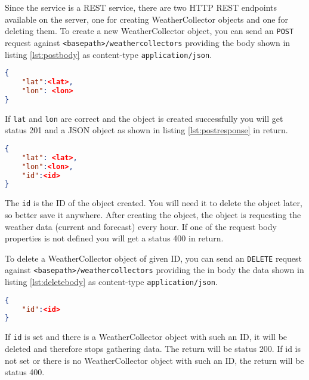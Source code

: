 Since the service is a REST service, there are two HTTP REST endpoints available on the server, one for creating WeatherCollector objects and one for deleting them.
To create a new WeatherCollector object, you can send an \texttt{POST} request against \texttt{<basepath>/weathercollectors} providing the body shown in listing \ref{lst:postbody} as content-type \texttt{application/json}. 
\begin{lstlisting}[caption={Body of \texttt{POST} request endpoint}, label={lst:postbody}, frame=single, language=json]
{ 
	"lat":<lat>, 
	"lon": <lon> 
}
\end{lstlisting} 
If \texttt{lat} and \texttt{lon} are correct and the object is created successfully you will get status 201 and a JSON object as shown in listing \ref{lst:postresponse} in return.
\begin{lstlisting}[caption={Body of the response of the \texttt{POST} request}, label={lst:postresponse}, frame=single, language=json]
{ 
	"lat": <lat>, 
	"lon":<lon>, 
	"id":<id> 
}
\end{lstlisting}
The \texttt{id} is the ID of the object created. 
You will need it to delete the object later, so better save it anywhere. 
After creating the object, the object is requesting the weather data (current and forecast) every hour. 
If one of the request body properties is not defined you will get a status 400 in return.

To delete a WeatherCollector object of given ID, you can send an \texttt{DELETE} request against \texttt{<basepath>/weathercollectors} providing the in body the data shown in listing \ref{lst:deletebody} as content-type \texttt{application/json}.
\begin{lstlisting}[caption={Body of \texttt{DELETE} request endpoint}, label={lst:deletebody}, frame=single, language=json]
{ 
	"id":<id> 
}
\end{lstlisting}
If \texttt{id} is set and there is a WeatherCollector object with such an ID, it will be deleted and therefore stops gathering data. 
The return will be status 200. 
If id is not set or there is no WeatherCollector object with such an ID, the return will be status 400.


